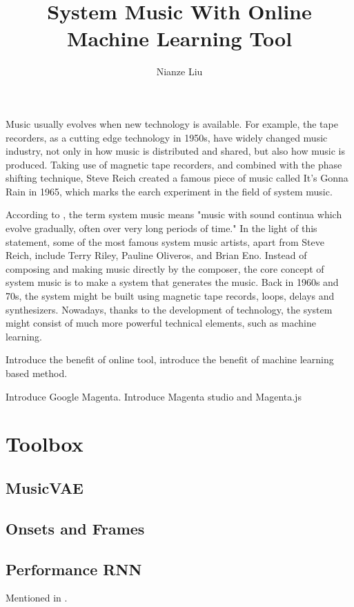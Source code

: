 \documentclass[man]{apa6}
\title{System Music With Online Machine Learning Tool}
\author{Nianze Liu}
\affiliation{New York University}
\begin{document}
\maketitle

Music usually evolves when new technology is available. For example, the tape recorders, as a cutting edge technology in 1950s, have widely changed music industry, not only in how music is distributed and shared, but also how music is produced. Taking use of magnetic tape recorders, and combined with the phase shifting technique, Steve Reich created a famous piece of music called It's Gonna Rain in 1965, which marks the earch experiment in the field of system music. 

According to \textcite{sutherland1994new}, the term system music means "music with sound continua which evolve gradually, often over very long periods of time." In the light of this statement, some of the most famous system music artists, apart from Steve Reich, include Terry Riley, Pauline Oliveros, and Brian Eno. Instead of composing and making music directly by the composer, the core concept of system music is to make a system that generates the music. Back in 1960s and 70s, the system might be built using magnetic tape records, loops, delays and synthesizers. Nowadays, thanks to the development of technology, the system might consist of much more powerful technical elements, such as machine learning.

Introduce the benefit of online tool, introduce the benefit of machine learning based method. 

Introduce Google Magenta. Introduce Magenta studio \parencite{magentastudio} and 
Magenta.js \parencite{magentajs}

\section{Toolbox}

\subsection{MusicVAE}
\lipsum[7]

\subsection{Onsets and Frames}
\lipsum[4]

\subsection{Performance RNN}
Mentioned in \textcite{performance-rnn-2017}.\lipsum[5]
\end{document}

